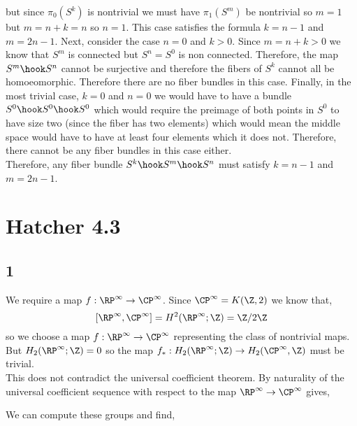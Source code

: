 \documentclass[12pt]{extarticle}
\begin{document}
but since $\pi_0(S^k)$ is nontrivial we must have $\pi_1(S^m)$ be nontrivial so $m = 1$ but $m = n + k = n$ so $n = 1$. This case satisfies the formula $k = n - 1$ and $m = 2 n - 1$. Next, consider the case $n = 0$ and $k > 0$. Since $m = n + k > 0$ we know that $S^m$ is connected but $S^n = S^0$ is non connected. Therefore, the map $S^m \hook S^n$ cannot be surjective and therefore the fibers of $S^k$ cannot all be homoeomorphic. Therefore there are no fiber bundles in this case. Finally, in the most trivial case, $k = 0$ and $n = 0$ we would have to have a bundle $S^0 \hook S^0 \hook S^0$ which would require the preimage of both points in $S^0$ to have size two (since the fiber has two elements) which would mean the middle space would have to have at least four elements which it does not. Therefore, there cannot be any fiber bundles in this case either. \bigskip\\
Therefore, any fiber bundle $S^k \hook S^m \hook S^n$ must satisfy $k = n - 1$ and $m = 2n - 1$. 

\section*{Hatcher 4.3}

\subsection{1}

We require a map $f : \RP^\infty \to \CP^\infty$. Since $\CP^\infty = K(\Z, 2)$ we know that,
\[ [\RP^\infty, \CP^\infty] = H^2(\RP^\infty; \Z) = \Z / 2 \Z \]
so we choose a map $f : \RP^\infty \to \CP^\infty$ representing the class of nontrivial maps. 
But $H_2(\RP^\infty ; \Z) = 0$ so the map $f_* : H_2(\RP^\infty ; \Z) \to H_2(\CP^\infty, \Z)$ must be trivial. 
\bigskip\\
This does not contradict the universal coefficient theorem. By naturality of the universal coefficient sequence with respect to the map $\RP^\infty \to \CP^{\infty}$ gives,
\begin{center}
\end{center}
We can compute these groups and find,
\end{document}
